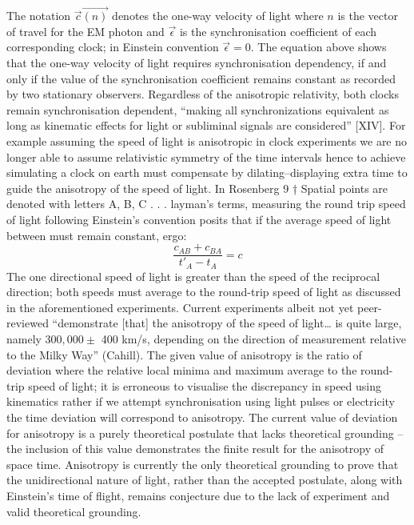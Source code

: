\documentclass[12pt,letterpaper]{article}
\begin{document}
 The notation $\vec {c}\vec{(n)}$ denotes the one-way velocity of light where $n$ is the vector of travel for the EM photon and $\vec \epsilon$ is the synchronisation coefficient of each corresponding clock; in Einstein convention  $\vec \epsilon=0$.  The equation above shows that the one-way velocity of light requires synchronisation dependency, if and only if the value of the synchronisation coefficient remains constant as recorded by two stationary observers. Regardless of the anisotropic relativity, both clocks remain synchronisation dependent, “making all synchronizations equivalent as long as kinematic effects for light or subliminal signals are considered” [XIV]. For example assuming the speed of light is anisotropic in clock experiments we are no longer able to assume relativistic symmetry of the time intervals hence to achieve simulating a clock on earth must compensate by dilating–displaying extra time to guide the anisotropy of the speed of light. In Rosenberg 9 † Spatial points are denoted with letters A, B, C . . . layman's terms, measuring the round trip speed of light following Einstein's convention posits that if the average speed of light between must remain constant, ergo: $$\frac {c_{AB}+c_{BA}}{t'_A-t_A}=c$$ The one directional speed of light is greater than the speed of the reciprocal direction; both speeds must average to the round-trip speed of light as discussed in the aforementioned experiments. Current experiments albeit not yet peer-reviewed “demonstrate [that] the anisotropy of the speed of light… is quite large, namely $300,000 \pm$ 400 km/s, depending on the direction of measurement relative to the Milky Way” (Cahill). The given value of anisotropy is the ratio of deviation where the relative local minima and maximum average to the round-trip speed of light; it is erroneous to visualise the discrepancy in speed using kinematics rather if we attempt synchronisation using light pulses or electricity the time deviation will correspond to anisotropy. The current value of deviation for anisotropy is a purely theoretical postulate that lacks theoretical grounding –the inclusion of this value demonstrates the finite result for the anisotropy of space time. Anisotropy is currently the only theoretical grounding to prove that the unidirectional nature of light, rather than the accepted postulate, along with Einstein's time of flight, remains conjecture due to the lack of experiment and valid theoretical grounding.
\end{document}
